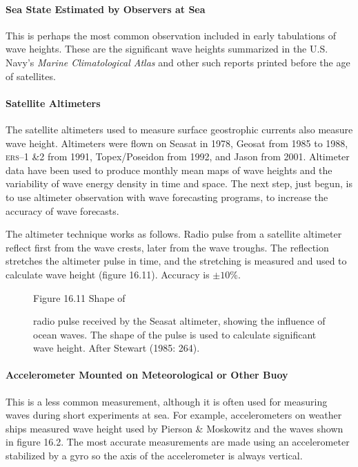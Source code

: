 \paragraph{Sea State Estimated by Observers at Sea}
This is perhaps the most common observation included in early
tabulations of wave heights. These are the significant wave heights
summarized in the U.S. Navy's \textit{Marine Climatological Atlas} and
other such reports printed before the age of satellites.

\paragraph{Satellite Altimeters}
The satellite altimeters used to measure surface
geo\-strophic currents also measure wave height. Altimeters were flown
on Seasat in 1978, Geosat from 1985 to 1988,
\textsc{ers--1 \&2} from 1991, Topex/Poseidon
from 1992, and Jason from 2001. Altimeter data have been
used to produce monthly mean maps of wave heights and the variability
of wave energy density in time and space. The next step, just begun,
is to use altimeter observation with wave forecasting programs, to
increase the accuracy of wave forecasts.

The altimeter technique works as follows. Radio pulse from a satellite
altimeter reflect first from the wave crests, later from the wave
troughs. The reflection stretches the altimeter pulse in time, and the
stretching is measured and used to calculate wave height (figure
16.11). Accuracy is $\pm 10$\%.

\begin{figure}[t!]
\footnotesize
Figure 16.11 Shape of \rule{0mm}{4ex}radio pulse received by the
Seasat altimeter, showing the influence of ocean waves. The shape of
the pulse is used to calculate significant wave height. After Stewart
(1985: 264).
\label{fig:altimeterpulse}
\vspace{-3ex}
\end{figure}

\paragraph{Accelerometer Mounted on Meteorological or Other Buoy}
This is a less common measurement, although it is often used for
measuring waves during short experiments at sea. For example,
accelerometers on weather ships measured wave height used by Pierson
\& Moskowitz and the waves shown in figure 16.2. The most accurate
measurements are made using an accelerometer stabilized by a gyro so
the axis of the accelerometer is always vertical.

